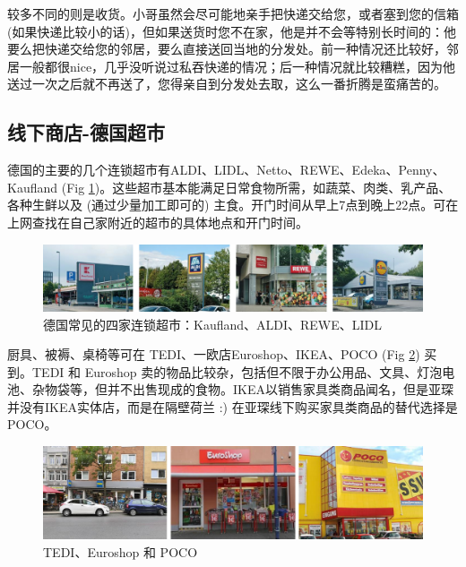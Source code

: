     较多不同的则是收货。小哥虽然会尽可能地亲手把快递交给您，或者塞到您的信箱 (如果快递比较小的话)，但如果送货时您不在家，他是并不会等特别长时间的：他要么把快递交给您的邻居，要么直接送回当地的分发处。前一种情况还比较好，邻居一般都很nice，几乎没听说过私吞快递的情况；后一种情况就比较糟糕，因为他送过一次之后就不再送了，您得亲自到分发处去取，这么一番折腾是蛮痛苦的。

  \subsection{线下商店-德国超市}\label{subsec:线下商店-德国超市}

    德国的主要的几个连锁超市有ALDI、LIDL、Netto、REWE、Edeka、Penny、Kaufland (Fig \ref{fig:德国常见的四家连锁超市})。这些超市基本能满足日常食物所需，如蔬菜、肉类、乳产品、各种生鲜以及 (通过少量加工即可的) 主食。开门时间从早上7点到晚上22点。可在上网查找在自己家附近的超市的具体地点和开门时间。

    \begin{figure}[ht]
      \centering
      \includegraphics[width=\textwidth]{在亚琛学习和生活/日常消费和饮食/德国超市/德国常见的四家连锁超市：Kaufland、ALDI、REWE、LIDL.png}
      \caption{德国常见的四家连锁超市：Kaufland、ALDI、REWE、LIDL}
      \label{fig:德国常见的四家连锁超市}
    \end{figure}

    厨具、被褥、桌椅等可在 TEDI、一欧店Euroshop、IKEA、POCO (Fig \ref{fig:TEDI、Euroshop 和 POCO}) 买到。TEDI 和 Euroshop 卖的物品比较杂，包括但不限于办公用品、文具、灯泡电池、杂物袋等，但并不出售现成的食物。IKEA以销售家具类商品闻名，但是亚琛并没有IKEA实体店，而是在隔壁荷兰 :) 在亚琛线下购买家具类商品的替代选择是 POCO。

    \begin{figure}[ht]
      \centering
      \includegraphics[width=.8\textwidth]{在亚琛学习和生活/日常消费和饮食/德国超市/TEDI、Euroshop 和 POCO.png}
      \caption{TEDI、Euroshop 和 POCO}
      \label{fig:TEDI、Euroshop 和 POCO}
    \end{figure}

